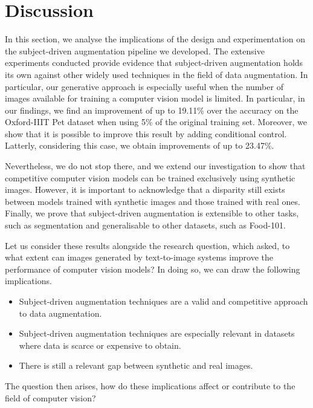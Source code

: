 \chapter{Discussion} \label{sec:discussion}

In this section, we analyse the implications of the design and experimentation on the subject-driven augmentation pipeline we developed. The extensive experiments conducted provide evidence that subject-driven augmentation holds its own against other widely used techniques in the field of data augmentation. In particular, our generative approach is especially useful when the number of images available for training a computer vision model is limited. In particular, in our findings, we find an improvement of up to 19.11\% over the accuracy on the Oxford-IIIT Pet dataset when using 5\% of the original training set. Moreover, we show that it is possible to improve this result by adding conditional control. Latterly, considering this case, we obtain improvements of up to 23.47\%. 

Nevertheless, we do not stop there, and we extend our investigation to show that competitive computer vision models can be trained exclusively using synthetic images. However, it is important to acknowledge that a disparity still exists between models trained with synthetic images and those trained with real ones. Finally, we prove that subject-driven augmentation is extensible to other tasks, such as segmentation and generalisable to other datasets, such as Food-101.

Let us consider these results alongside the research question, which asked, to what extent can images generated by text-to-image systems improve the performance of computer vision models? In doing so, we can draw the following implications.

\begin{itemize}
    \item Subject-driven augmentation techniques are a valid and competitive approach to data augmentation.
    \item Subject-driven augmentation techniques are especially relevant in datasets where data is scarce or expensive to obtain.
    \item There is still a relevant gap between synthetic and real images.
\end{itemize}

The question then arises, how do these implications affect or contribute to the field of computer vision? 

